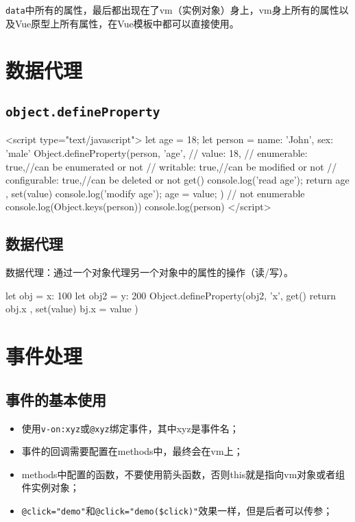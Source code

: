\verb|data|中所有的属性，最后都出现在了vm（实例对象）身上，vm身上所有的属性以及Vue原型上所有属性，在Vue模板中都可以直接使用。
\section{数据代理}
\subsection{\texttt{object.defineProperty}}
\begin{html}
    <script type="text/javascript">
    let age = 18;
    let person = {
    name: 'John',
    sex: 'male'
    }
    Object.defineProperty(person, 'age', {
            // value: 18,
            // enumerable: true,//can be enumerated or not
            // writable: true,//can be modified or not
            // configurable: true,//can be deleted or not
            get() {
                    console.log('read age');
                    return age
                },
            set(value) {
                    console.log('modify age');
                    age = value;
                }
        })
    // not enumerable
    console.log(Object.keys(person))
    console.log(person)
    </script>
\end{html}
\subsection{数据代理}
数据代理：通过一个对象代理另一个对象中的属性的操作（读/写）。
\begin{html}
    let obj = {
    x: 100
    }
    let obj2 = {
    y: 200
    }
    Object.defineProperty(obj2, 'x', {
            get() {
                    return obj.x
                },
            set(value) {
                    bj.x = value
                }
        })
\end{html}
\section{事件处理}
\subsection{事件的基本使用}
\begin{itemize}
    \item 使用\verb|v-on:xyz|或\verb|@xyz|绑定事件，其中xyz是事件名；
    \item 事件的回调需要配置在methods中，最终会在vm上；
    \item methods中配置的函数，不要使用箭头函数，否则this就是指向vm对象或者组件实例对象；
    \item \verb|@click="demo"|和\verb|@click="demo($click)"|效果一样，但是后者可以传参；
\end{itemize}